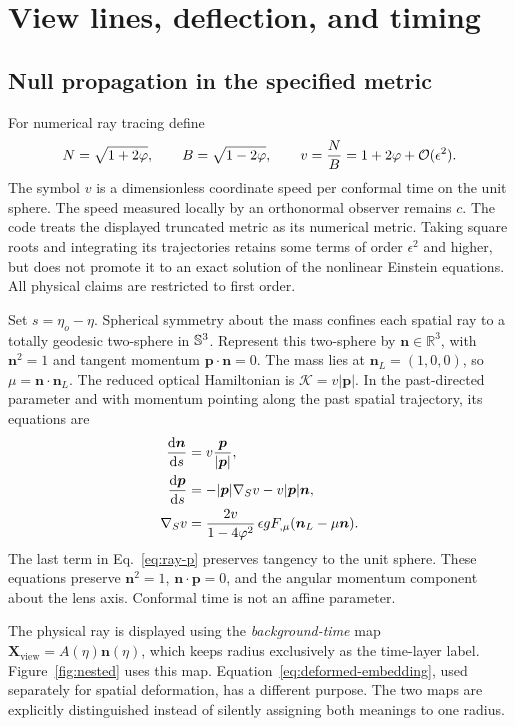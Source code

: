 \section{View lines, deflection, and timing}
\label{sec:rays}
\subsection{Null propagation in the specified metric}
For numerical ray tracing define
\begin{equation}\label{eq:optical}
 N=\sqrt{1+2\varphi},\qquad B=\sqrt{1-2\varphi},\qquad
 v=\frac{N}{B}=1+2\varphi+\mathcal O(\epsilon^2).
\end{equation}
The symbol $v$ is a dimensionless coordinate speed per conformal time on
the unit sphere. The speed measured locally by an orthonormal observer
remains $c$. The code treats the displayed truncated metric as its
numerical metric. Taking square roots and integrating its trajectories
retains some terms of order $\epsilon^2$ and higher, but does not promote
it to an exact solution of the nonlinear Einstein equations. All physical
claims are restricted to first order.

Set $s=\eta_o-\eta$. Spherical symmetry about the mass confines each
spatial ray to a totally geodesic two-sphere in $\mathbb S^3$. Represent this
two-sphere by $\bm n\in\mathbb R^3$, with
$\bm n^2=1$ and tangent momentum $\bm p\cdot\bm n=0$. The mass lies
at $\bm n_L=(1,0,0)$, so $\mu=\bm n\cdot\bm n_L$.
The reduced optical Hamiltonian is $\mathcal K=v|\bm p|$. In the
past-directed parameter and with momentum pointing along the past
spatial trajectory, its equations are
\begin{align}
 \frac{\mathrm{d}\bm n}{\mathrm{d} s}&=v\frac{\bm p}{|\bm p|},\label{eq:ray-n}\\
 \frac{\mathrm{d}\bm p}{\mathrm{d} s}&=-|\bm p|\nabla_S v-v|\bm p|\bm n,
 \label{eq:ray-p}\\
 \nabla_Sv&=\frac{2v}{1-4\varphi^2}\,
 \epsilon g F_{,\mu}(\bm n_L-\mu\bm n).
 \label{eq:gradient}
\end{align}
The last term in Eq.~\eqref{eq:ray-p} preserves tangency to the unit
sphere. These equations preserve $\bm n^2=1$, $\bm n\cdot\bm p=0$,
and the angular momentum component about the lens axis. Conformal time
is not an affine parameter.

The physical ray is displayed using the \emph{background-time} map
$\bm X_{
\mathrm{view}}=A(\eta)\bm n(\eta)$, which keeps radius exclusively as
the time-layer label. Figure~\ref{fig:nested} uses this map.
Equation~\eqref{eq:deformed-embedding}, used separately for spatial
deformation, has a different purpose. The two maps are explicitly
distinguished instead of silently assigning both meanings to one radius.

